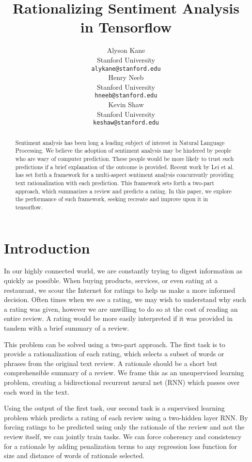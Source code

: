 \documentclass{article} %
\title{Rationalizing Sentiment Analysis in Tensorflow}
\author{
Alyson Kane \\
Stanford University\\
\texttt{alykane@stanford.edu} \\
\And
Henry Neeb \\
Stanford University\\
\texttt{hneeb@stanford.edu}\\
\And
Kevin Shaw \\
Stanford University\\
\texttt{keshaw@stanford.edu}\\
}
\begin{document}
\maketitle

\begin{abstract}

Sentiment analysis has been long a leading subject of interest in Natural
Language Processing. We believe the adoption of sentiment analysis may be
hindered by people who are wary of computer prediction. These people would be
more likely to trust such predictions if a brief explanation of the outcome is
provided. Recent work by Lei et al. has set forth a framework for a multi-aspect
sentiment analysis concurrently providing text rationalization with each
prediction. This framework sets forth a two-part approach, which summarizes a
review and predicts a rating. In this paper, we explore the performance of such
framework, seeking  recreate and improve upon it in tensorflow.

\end{abstract}

\section{Introduction}

In our highly connected world, we are constantly trying to digest information as
quickly as possible. When buying products, services, or even eating at a
restaurant, we scour the Internet for ratings to help us make a more informed
decision. Often times when we see a rating, we may wish to understand why such a
rating was given, however we are unwilling to do so at the cost of reading an
entire review. A rating would be more easily interpreted if it was provided in
tandem with a brief summary of a review.

This problem can be solved using a two-part approach. The first task is to
provide a rationalization of each rating, which selects a subset of words or
phrases from the original text review. A rationale should be a short but
comprehensible summary of a review. We frame this as an unsupervised learning
problem, creating a bidirectional recurrent neural net (RNN) which passes over
each word in the text.

Using the output of the first task, our second task is a supervised learning
problem which predicts a rating of each review using a two-hidden layer RNN. By
forcing ratings to be predicted using only the rationale of the review and not
the review itself, we can jointly train tasks. We can force coherency and
consistency for a rationale by adding penalization terms to any regression loss
function for size and distance of words of rationale selected.
\end{document}
